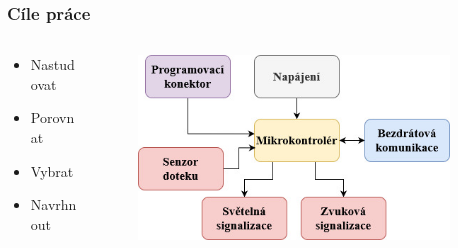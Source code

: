 \documentclass[%
  12pt,       				%
	t,                  %
	aspectratio=1610,   %
	unicode,						%
]{beamer}				    	%
\begin{document}
\begin{frame} 
	\frametitle{Cíle práce}

	\begin{columns}[T] 								%
		\begin{column}{0.25\textwidth}		%
			\begin{itemize}
				\item Nastudovat
				\item Porovnat
				\item Vybrat
				\item Navrhnout 
		\end{itemize}
		\end{column}
		\begin{column}{0.65\textwidth}		%
			\begin{figure}%
				\centering
				\vspace{0.4cm}	              %
				\includegraphics[width=1\columnwidth]{obrazky/zakladni_blokove_schema_prezentace.jpg}
			\end{figure}
		\end{column}
		\begin{column}{0.1\textwidth}		%
		\end{column}
	\end{columns}	
		
	\end{frame}
\end{document}
